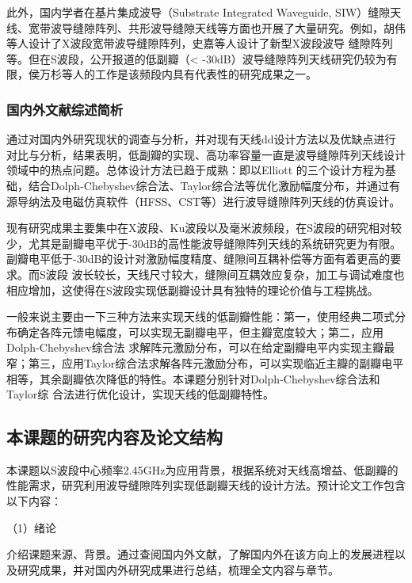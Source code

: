     此外，国内学者在基片集成波导（Substrate Integrated Waveguide, SIW）缝隙天线、宽带波导缝隙阵列、共形波导缝隙天线等方面也开展了大量研究。例如，胡伟\supercite{13}等人设计了X波段宽带波导缝隙阵列，史嘉\supercite{14}等人设计了新型X波段波导
缝隙阵列等。但在S波段，公开报道的低副瓣（< -30dB）波导缝隙阵列天线研究仍较为有限，侯万杉\supercite{11}等人的工作是该频段内具有代表性的研究成果之一。

\subsubsection{国内外文献综述简析}
    通过对国内外研究现状的调查与分析，并对现有天线dd设计方法以及优缺点进行对比与分析，结果表明，低副瓣的实现、高功率容量一直是波导缝隙阵列天线设计领域中的热点问题。总体设计方法已趋于成熟：即以Elliott\supercite{4}\supercite{5}
的三个设计方程为基础，结合Dolph-Chebyshev综合法、Taylor综合法等优化激励幅度分布，并通过有源导纳法及电磁仿真软件（HFSS、CST等）进行波导缝隙阵列天线的仿真设计。

    现有研究成果主要集中在X波段、Ku波段以及毫米波频段，在S波段的研究相对较少，尤其是副瓣电平优于-30dB的高性能波导缝隙阵列天线的系统研究更为有限。副瓣电平低于-30dB的设计对激励幅度精度、缝隙间互耦补偿等方面有着更高的要求。而S波段
波长较长，天线尺寸较大，缝隙间互耦效应复杂，加工与调试难度也相应增加，这使得在S波段实现低副瓣设计具有独特的理论价值与工程挑战。

    一般来说主要由一下三种方法来实现天线的低副瓣性能：第一，使用经典二项式分布确定各阵元馈电幅度\supercite{16}\supercite{17}，可以实现无副瓣电平，但主瓣宽度较大；第二，应用Dolph-Chebyshev\supercite{18}\supercite{19}\supercite{20}\supercite{21}综合法
求解阵元激励分布，可以在给定副瓣电平内实现主瓣最窄；第三，应用Taylor\supercite{22}\supercite{23}\supercite{24}综合法求解各阵元激励分布，可以实现临近主瓣的副瓣电平相等，其余副瓣依次降低的特性。本课题分别针对Dolph-Chebyshev综合法和Taylor综
合法进行优化设计，实现天线的低副瓣特性。

\subsection{本课题的研究内容及论文结构}
    本课题以S波段中心频率2.45GHz为应用背景，根据系统对天线高增益、低副瓣的性能需求，研究利用波导缝隙阵列实现低副瓣天线的设计方法。预计论文工作包含以下内容：
    
    （1）绪论

    介绍课题来源、背景。通过查阅国内外文献，了解国内外在该方向上的发展进程以及研究成果，并对国内外研究成果进行总结，梳理全文内容与章节。

